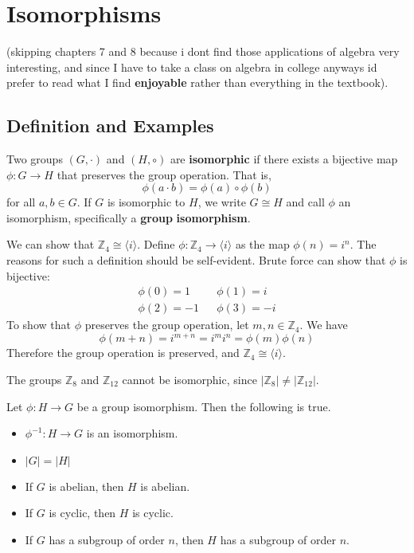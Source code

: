 \documentclass[12pt, letterpaper]{report}
\begin{document}
\chapter{Isomorphisms}
(skipping chapters 7 and 8 because i dont find those applications of algebra very interesting, and since I have to take a class on algebra in college anyways id prefer to read what I find \textbf{enjoyable} rather than everything in the textbook).
\section{Definition and Examples}
\begin{definition}
	Two groups \((G,\cdot)\) and \((H,\circ )\) are \textbf{isomorphic} if there exists a bijective map \(\phi :G\to H\) that preserves the group operation. That is,
\[
	\phi (a\cdot b)=\phi (a)\circ \phi (b)
\]
for all \(a,b\in G\). If \(G\) is isomorphic to \(H\), we write \(G\cong H\) and call \(\phi \) an isomorphism, specifically a \textbf{group} \textbf{isomorphism}.
\end{definition}
\begin{eg}
	We can show that \(\mathbb{Z}_{4}\cong \langle i \rangle  \). Define \(\phi :\mathbb{Z}_4 \to \langle i \rangle \) as the map \(\phi (n)=i^{n} \). The reasons for such a definition should be self-evident. Brute force can show that \(\phi \) is bijective:
	\begin{align*}
		\phi (0)=1&&\phi (1)=i\\
		\phi (2)=-1&&\phi (3)=-i
	\end{align*}
	To show that \(\phi \) preserves the group operation, let \(m,n\in \mathbb{Z}_4\). We have
	\[
		\phi (m+n)=i^{m+n}=i^m i^n = \phi (m)\phi (n)
	\]
	Therefore the group operation is preserved, and \(\mathbb{Z}_4 \cong \langle i \rangle \).
\end{eg}
\begin{eg}
	The groups \(\mathbb{Z}_8\) and \(\mathbb{Z}_{12} \) cannot be isomorphic, since \(\vert \mathbb{Z}_8 \vert \neq \vert \mathbb{Z}_{12}  \vert  \).
\end{eg}
\begin{theorem}\label{isowowo}
	Let \(\phi :H\to G\) be a group isomorphism. Then the following is true. 
	\begin{itemize}
		\item \(\phi ^{-1} :H\to G\) is an isomorphism. 
		\item \(\vert G \vert =\vert H \vert  \)
		\item If \(G\) is abelian, then \(H\) is abelian.
		\item If \(G\) is cyclic, then \(H\) is cyclic.
		\item If \(G\) has a subgroup of order \(n\), then \(H\) has a subgroup of order \(n\).
	\end{itemize}
\end{theorem}
\end{document}
